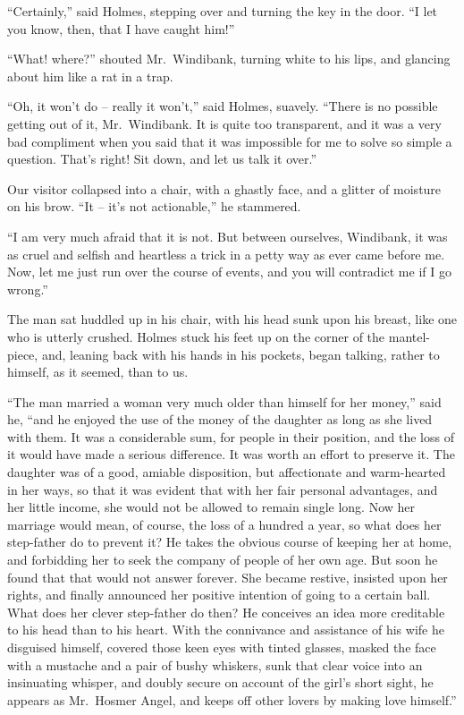“Certainly,” said Holmes, stepping over and turning the
key in the door. “I let you know, then, that I have caught
him!”

“What! where?” shouted Mr.~Windibank, turning white to
his lips, and glancing about him like a rat in a trap.

“Oh, it won’t do -- really it won’t,” said Holmes, suavely.
“There is no possible getting out of it, Mr.~Windibank. It is
quite too transparent, and it was a very bad compliment when
you said that it was impossible for me to solve so simple a
question. That’s right! Sit down, and let us talk it over.”

Our visitor collapsed into a chair, with a ghastly face, and
a glitter of moisture on his brow. “It -- it’s not actionable,”
he stammered.

“I am very much afraid that it is not. But between
ourselves, Windibank, it was as cruel and selfish and heartless a
trick in a petty way as ever came before me. Now, let me
just run over the course of events, and you will contradict me
if I go wrong.”

The man sat huddled up in his chair, with his head sunk
upon his breast, like one who is utterly crushed. Holmes
stuck his feet up on the corner of the mantel-piece, and, leaning
back with his hands in his pockets, began talking, rather
to himself, as it seemed, than to us.

“The man married a woman very much older than himself
for her money,” said he, “and he enjoyed the use of the
money of the daughter as long as she lived with them. It
was a considerable sum, for people in their position, and the
loss of it would have made a serious difference. It was worth
an effort to preserve it. The daughter was of a good, amiable
disposition, but affectionate and warm-hearted in her ways, so
that it was evident that with her fair personal advantages,
and her little income, she would not be allowed to remain
single long. Now her marriage would mean, of course, the
loss of a hundred a year, so what does her step-father do to
prevent it? He takes the obvious course of keeping her at
home, and forbidding her to seek the company of people of
her own age. But soon he found that that would not answer
forever. She became restive, insisted upon her rights, and
finally announced her positive intention of going to a certain
ball. What does her clever step-father do then? He conceives
an idea more creditable to his head than to his heart.
With the connivance and assistance of his wife he disguised
himself, covered those keen eyes with tinted glasses, masked
the face with a mustache and a pair of bushy whiskers, sunk
that clear voice into an insinuating whisper, and doubly secure
on account of the girl’s short sight, he appears as Mr.~Hosmer
Angel, and keeps off other lovers by making love himself.”

